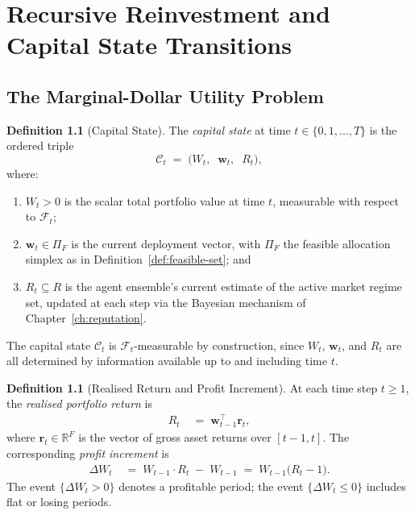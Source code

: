 \documentclass[12pt,openany]{book}
\newcommand{\bfw}{\mathbf{w}}
\newcommand{\calF}{\mathcal{F}}
\numberwithin{equation}{chapter}
\theoremstyle{plain}
\theoremstyle{definition}
\newtheorem{definition}[theorem]{Definition}
\theoremstyle{remark}
\numberwithin{equation}{chapter}
\theoremstyle{plain}
\newcommand{\calR}{\mathcal{R}}
\newcommand{\calC}{\mathcal{C}}
\newcommand{\bfr}{\mathbf{r}}
\def\calR{R}%
\begin{document}
\chapter{Recursive Reinvestment and Capital State Transitions}
\label{ch:reinvestment}

\section{The Marginal-Dollar Utility Problem}

\begin{definition}[Capital State]
\label{def:capital-state}
The \emph{capital state} at time $t \in \{0,1,\ldots,T\}$ is the
ordered triple
\begin{equation}
  \calC_t \;=\; \bigl(W_t,\;\; \bfw_t,\;\; \calR_t\bigr),
  \label{eq:capital-state}
\end{equation}
where:
\begin{enumerate}
  \item[\textup{(i)}] $W_t > 0$ is the scalar total portfolio value
        at time $t$, measurable with respect to $\calF_t$;
  \item[\textup{(ii)}] $\bfw_t \in \Pi_F$ is the current deployment
        vector, with $\Pi_F$ the feasible allocation simplex as in
        Definition~\ref{def:feasible-set}; and
  \item[\textup{(iii)}] $\calR_t \subseteq \calR$ is the agent
        ensemble's current estimate of the active market regime set,
        updated at each step via the Bayesian mechanism of
        Chapter~\ref{ch:reputation}.
\end{enumerate}
The capital state $\calC_t$ is $\calF_t$-measurable by construction,
since $W_t$, $\bfw_t$, and $\calR_t$ are all determined by information
available up to and including time $t$.
\end{definition}

\begin{definition}[Realised Return and Profit Increment]
\label{def:realised-return}
At each time step $t \geq 1$, the \emph{realised portfolio return} is
\begin{align}
  R_t &\;=\; \bfw_{t-1}^{\top} \bfr_t,
  \label{eq:realised-return}
\end{align}
where $\bfr_t \in \mathbb{R}^F$ is the vector of gross asset returns
over $[t-1, t]$.  The corresponding \emph{profit increment} is
\begin{align}
  \Delta W_t &\;=\; W_{t-1} \cdot R_t \;-\; W_{t-1}
               \;=\; W_{t-1}\bigl(R_t - 1\bigr).
  \label{eq:profit-increment}
\end{align}
The event $\{\Delta W_t > 0\}$ denotes a profitable period; the
event $\{\Delta W_t \leq 0\}$ includes flat or losing periods.
\end{definition}
\end{document}
